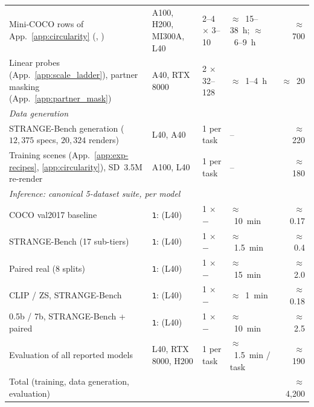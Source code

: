 \begin{table}[h]
{\begin{tabular}{@{}llllr@{}}
Mini-COCO rows of App.~\ref{app:circularity} (\codino{}, \gdino{}) & A100, H200, MI300A, L40 & 2--4 $\times$ 3--10 & $\approx$~15--38~h; $\approx$~6--9~h & $\approx$~700 \\
Linear probes (App.~\ref{app:scale_ladder}), partner masking (App.~\ref{app:partner_mask}) & A40, RTX\,8000 & 2 $\times$ 32--128 & $\approx$~1--4~h & $\approx$~20 \\
\midrule
\multicolumn{5}{l}{\emph{Data generation}} \\
STRANGE-Bench generation ($12{,}375$ specs, $20{,}324$ renders) & L40, A40 & 1 per task & -- & $\approx$~220 \\
Training scenes (App.~\ref{app:exp-recipes}, \ref{app:circularity}), SD~3.5M re-render & A100, L40 & 1 per task & -- & $\approx$~180 \\
\midrule
\multicolumn{5}{l}{\emph{Inference: canonical 5-dataset suite, per model}} \\
COCO val2017 baseline                          & \texttt{1}: (L40) & 1 $\times$ $-$ & $\approx$~10~min & $\approx$~0.17 \\
STRANGE-Bench (17 sub-tiers)                   & \texttt{1}: (L40) & 1 $\times$ $-$ & $\approx$~1.5~min & $\approx$~0.4 \\
Paired real (8 splits)                         & \texttt{1}: (L40) & 1 $\times$ $-$ & $\approx$~15~min & $\approx$~2.0 \\
CLIP / \openclip{} ZS, STRANGE-Bench           & \texttt{1}: (L40) & 1 $\times$ $-$ & $\approx$~1~min  & $\approx$~0.18 \\
\llava{} 0.5b / 7b, STRANGE-Bench + paired     & \texttt{1}: (L40) & 1 $\times$ $-$ & $\approx$~10~min & $\approx$~2.5 \\
\midrule
Evaluation of all reported models & L40, RTX\,8000, H200 & 1 per task & $\approx$~1.5~min / task & $\approx$~190 \\
Total (training, data generation, evaluation) & & & & $\approx$~4{,}200 \\
\bottomrule
\end{tabular}}%
\ifdim\wd\crcomputebox>\linewidth\resizebox{\linewidth}{!}{\usebox{\crcomputebox}}\else\usebox{\crcomputebox}\fi
\end{table}

